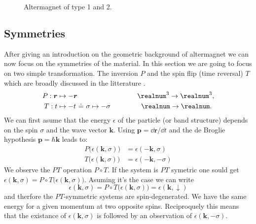 \documentclass[../main.tex]{main.tex}
\begin{document}
\begin{figure}[H]

    \caption{Altermagnet of type 1 and 2.}
    \label{fig:altermagnet_lattice}
\end{figure}    

\subsection{Symmetries}
After giving an introduction on the geometric background of altermagnet we can now focus on the symmetries of the material. In this section
we are going to focus on two simple transformation. The inversion $P$ and the spin flip (time reversal) $T$ which are broadly discussed in the litterature \cite{Smejkal2022}\cite{Smejkal2022_2}.
\begin{alignat*}{2}
    P : \bm{r} &\mapsto -\bm{r} ~~~~~~~~~~~~~~~~~~~~ &~~~\realnum^3 \rightarrow \realnum^3, \\
    T : t &\mapsto -t  ~\hat{=} ~\sigma \mapsto -\sigma &\realnum \rightarrow \realnum.~
\end{alignat*}
We can first asume that the energy $\epsilon$ of the particle (or band structure) depends on the spin $\sigma$ and the wave vector $\bm{k}$. Using $\bm{p} = \dd \bm{r}/\dd t$ and the de Broglie hypothesis 
$\bm{p} = \hbar\bm{k}$ \cite{Broglie1924} leads to: 
\begin{align*}
    P \bigl(\epsilon(\bm{k}, \sigma)\bigr) &= \epsilon(-\bm{k}, \sigma)\\
    T \bigl(\epsilon(\bm{k}, \sigma)\bigr) &= \epsilon(-\bm{k}, -\sigma)
\end{align*}
We observe the $PT$ operation $P\circ T$. If the system is $PT$ symetric one sould get $\epsilon(\bm{k}, \sigma)= P\circ T\bigl(\epsilon(\bm{k}, \sigma)\bigr)$.
Asuming it's the case we can write
\[
    \epsilon(\bm{k}, \sigma)= P\circ T\bigl(\epsilon(\bm{k}, \sigma)\bigr) =  \epsilon(\bm{k}, \downarrow)
\] 
and therfore the $PT$-symmetric systems are spin-degenerated. We have the same energy for a given momentum at two opposite spins.
 Reciproquely this means that the existance 
of $ \epsilon(\bm{k}, \sigma)$ is followed by an observation of $ \epsilon(\bm{k}, -\sigma)$.\\
\end{document}
